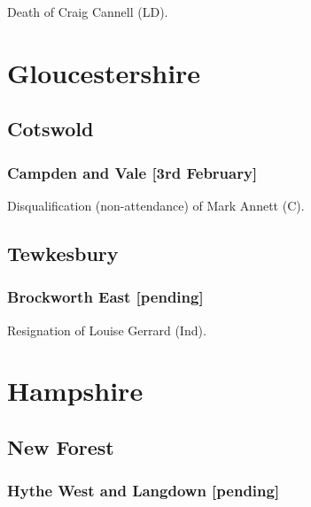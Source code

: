 \documentclass[a4paper,openany]{book}
\begin{document}
\begin{resultsiii}

Death of Craig Cannell (LD).

\section{Gloucestershire}

\subsection*{Cotswold}

\subsubsection*{Campden and Vale \hspace*{\fill}\nolinebreak[1]%
	\enspace\hspace*{\fill}
	[3rd February]}


Disqualification (non-attendance) of Mark Annett (C).

\subsection*{Tewkesbury}

\subsubsection*{Brockworth East \hspace*{\fill}\nolinebreak[1]%
	\enspace\hspace*{\fill}
	[pending]}


Resignation of Louise Gerrard (Ind).

\section{Hampshire}

\subsection*{New Forest}

\subsubsection*{Hythe West and Langdown \hspace*{\fill}\nolinebreak[1]%
	\enspace\hspace*{\fill}
	[pending]}


\end{resultsiii}
\end{document}
